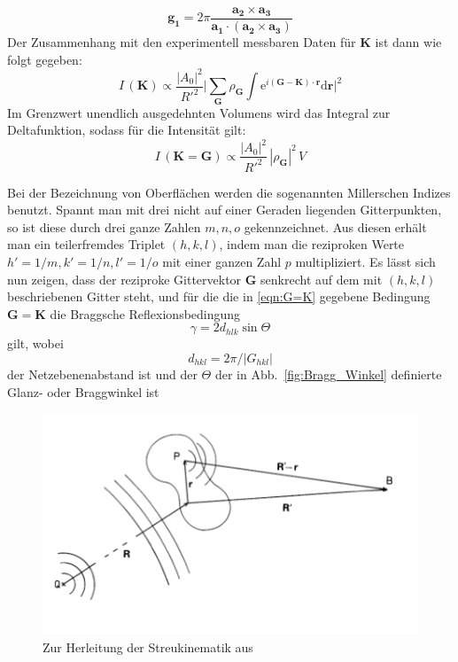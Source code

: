 \begin{equation}
    \mathbf{g_1} = 2 \pi \frac{\mathbf{a_2 \times a_3} }
        {\mathbf{a_1\cdot (a_2 \times a_3)}}
\end{equation}
Der Zusammenhang mit den experimentell messbaren Daten für $\mathbf{K}$ ist dann wie 
folgt gegeben:
\begin{equation} \label{eqn:G=K}
    I\,(\mathbf{K}) \propto \frac{|A_0|^2}{R'^2} \Big| \sum_{\mathbf{G}} \rho_{\mathbf{G}} 
    \int \mathrm{e}^{i \mathbf{(G - K) \cdot r}} \mathrm{d} \mathbf{r} \Big|^2
\end{equation}
Im Grenzwert unendlich ausgedehnten Volumens wird das Integral zur Deltafunktion, sodass 
für die Intensität gilt:
\begin{equation}
    I\,(\mathbf{K = G}) \propto \frac{|A_0|^2}{R'^2} \,|\rho_{\mathbf{G}} |^2 \, V
\end{equation}

Bei der Bezeichnung von Oberflächen werden die sogenannten Millerschen Indizes benutzt. 
Spannt man mit drei nicht auf einer Geraden liegenden Gitterpunkten, so ist diese durch 
drei ganze Zahlen $m, n, o$ gekennzeichnet. Aus diesen erhält man ein teilerfremdes 
Triplet $(h, k, l)$, indem man die reziproken Werte $h' = 1/m, k' = 1/n, l' = 1/o$ mit 
einer ganzen Zahl $p$ multipliziert. Es lässt sich nun zeigen, dass der reziproke 
Gittervektor $\mathbf{G}$ senkrecht auf dem mit $(h, k, l)$ beschriebenen Gitter steht, 
und für die die in \ref{eqn:G=K} gegebene Bedingung $\mathbf{G = K}$ die Braggsche Reflexionsbedingung 
\begin{equation}
    \gamma = 2 d_{hlk} \sin \Theta
\end{equation}
gilt, wobei 
\begin{equation}
    d_{hkl}=2 \pi / |G_{hkl}|
\end{equation}
der Netzebenenabstand ist und der $\Theta$ der in Abb.~\ref{fig:Bragg_Winkel} definierte
Glanz- oder Braggwinkel ist



\begin{figure}
    \includegraphics[width=1.0\textwidth]{pics/scatter_geometry}
    \caption{Zur Herleitung der Streukinematik
aus \cite{ibach2009festkorperphysik} }
    \label{fig:scatter_geometry}
\end{figure}

